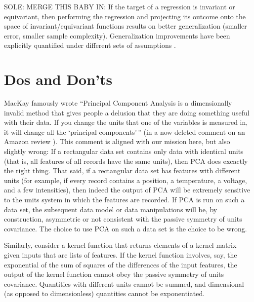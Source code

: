 \documentclass{article}
\theoremstyle{plain}
\theoremstyle{definition}
\theoremstyle{remark}
\begin{document}
SOLE: MERGE THIS BABY IN: If the target of a regression is invariant or equivariant, then performing the regression and projecting its outcome onto the space of invariant/equivariant functions results on better generalization (smaller error, smaller sample complexity).
Generalization improvements have been explicitly quantified under different sets of assumptions \cite{bietti2021sample, elesedy2021provably, mei2021learning, elesedy2021kernel}.

\section{Dos and Don'ts}\label{sec:dos}

MacKay famously wrote ``Principal Component Analysis is a dimensionally invalid method that gives people a delusion that they are doing something useful with their data. If you change the units that one of the variables is measured in, it will change all the `principal components'\,'' (in a now-deleted comment on an Amazon review \citealt{muldoonmedium}).
This comment is aligned with our mission here, but also slightly wrong: If a rectangular data set contains only data with identical units (that is, all features of all records have the same units), then PCA does excactly the right thing.
That said, if a rectangular data set has features with different units (for example, if every record contains a position, a temperature, a voltage, and a few intensities), then indeed the output of PCA will be extremely sensitive to the units system in which the features are recorded.
If PCA is run on such a data set, the subsequent data model or data manipulations will be, by construction, asymmetric or not consistent with the passive symmetry of units covariance.
The choice to use PCA on such a data set is the choice to be wrong.

Similarly, consider a kernel function that returns elements of a kernel matrix given inputs that are lists of features.
If the kernel function involves, say, the exponential of the sum of squares of the differences of the input features, the output of the kernel function cannot obey the passive symmetry of units covariance.
Quantities with different units cannot be summed, and dimensional (as opposed to dimensionless) quantities cannot be exponentiated.
\end{document}
